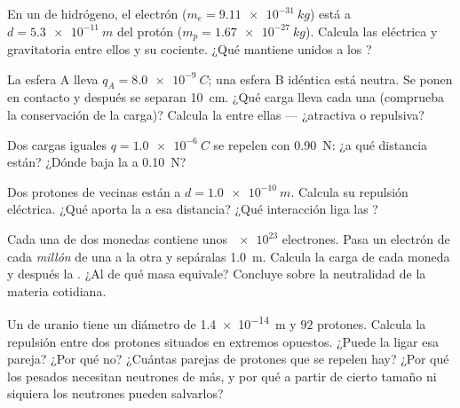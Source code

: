 \begin{exercise}[$\star\star$]\label{exo:g11:fundamental-interactions:7}
En un  de hidrógeno, el electrón ($m_e = \qty{9.11e-31}{kg}$) está
a $d = \qty{5.3e-11}{m}$ del protón ($m_p = \qty{1.67e-27}{kg}$).
Calcula las  eléctrica y gravitatoria entre ellos y su cociente.
¿Qué mantiene unidos a los ?
\end{exercise}

\begin{exercise}[$\star\star$]\label{exo:g11:fundamental-interactions:8}
La esfera A lleva $q_A = \qty{+8.0e-9}{C}$; una esfera B idéntica está
neutra. Se ponen en contacto y después se separan \qty{10}{cm}. ¿Qué
carga lleva cada una (comprueba la conservación de la carga)? Calcula la
 entre ellas --- ¿atractiva o repulsiva?
\end{exercise}

\begin{exercise}[$\star\star$]\label{exo:g11:fundamental-interactions:9}
Dos cargas iguales $q = \qty{1.0e-6}{C}$ se repelen con \qty{0.90}{N}:
¿a qué distancia están? ¿Dónde baja la  a \qty{0.10}{N}?
\end{exercise}

\begin{exercise}[$\star\star$]\label{exo:g11:fundamental-interactions:10}
Dos protones de  vecinas están a $d = \qty{1.0e-10}{m}$.
Calcula su repulsión eléctrica. ¿Qué aporta la  a esa
distancia? ¿Qué interacción liga las ?
\end{exercise}

\begin{exercise}[$\star\star$]\label{exo:g11:fundamental-interactions:11}
Cada una de dos monedas contiene unos $\num{e23}$ electrones. Pasa un
electrón de cada \emph{millón} de una a la otra y sepáralas
\qty{1.0}{m}. Calcula la carga de cada moneda y después la . ¿Al
 de qué masa equivale? Concluye sobre la neutralidad de la materia
cotidiana.
\end{exercise}

\begin{exercise}[$\star\star\star$]\label{exo:g11:fundamental-interactions:12}
Un  de uranio tiene un diámetro de \qty{1.4e-14}{m} y $92$
protones. Calcula la repulsión entre dos protones situados en extremos
opuestos. ¿Puede la  ligar esa pareja? ¿Por qué no?
¿Cuántas parejas de protones que se repelen hay? ¿Por qué los 
pesados necesitan neutrones de más, y por qué a partir de cierto tamaño
ni siquiera los neutrones pueden salvarlos?
\end{exercise}

